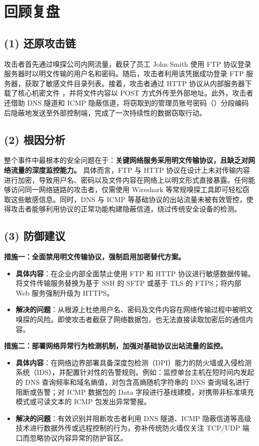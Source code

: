 \documentclass[12pt]{ctexart}
\begin{document}
	\section{回顾复盘}
	
	\subsection*{(1) 还原攻击链}
	
	攻击者首先通过嗅探公司内网流量，截获了员工 John Smith 使用 FTP 协议登录服务器时以明文传输的用户名和密码。随后，攻击者利用该凭据成功登录 FTP 服务器，获取了敏感文件目录列表。接着，攻击者通过 HTTP 协议从内部服务器下载了核心机密文件 ，并将文件内容以 POST 方式外传至外部地址。此外，攻击者还借助 DNS 隧道和 ICMP 隐蔽信道，将窃取到的管理员账号密码（）分段编码后隐蔽地发送至外部控制端，完成了一次持续性的数据窃取行动。
	
	\subsection*{(2) 根因分析}
	
	整个事件中最根本的安全问题在于：\textbf{关键网络服务采用明文传输协议，且缺乏对网络流量的深度监控能力。} 具体而言，FTP 与 HTTP 协议在设计上未对传输内容进行加密，导致用户名、密码以及文件内容在网络上以明文形式直接暴露。任何能够访问同一网络链路的攻击者，仅需使用 Wireshark 等常规嗅探工具即可轻松窃取这些敏感信息。同时，DNS 与 ICMP 等基础协议的出站流量未被有效管控，使得攻击者能够利用协议的正常功能构建隐蔽信道，绕过传统安全设备的检测。
	
	\subsection*{(3) 防御建议}
	
	\textbf{措施一：全面禁用明文传输协议，强制启用加密替代方案。}
	\begin{itemize}
		\item \textbf{具体内容}：在企业内部全面禁止使用 FTP 和 HTTP 协议进行敏感数据传输。将文件传输服务替换为基于 SSH 的 SFTP 或基于 TLS 的 FTPS；将内部 Web 服务强制升级为 HTTPS。
		\item \textbf{解决的问题}：从根源上杜绝用户名、密码及文件内容在网络传输过程中被明文嗅探的风险。即使攻击者截获了网络数据包，也无法直接读取加密后的通信内容。
	\end{itemize}
	
	\textbf{措施二：部署网络异常行为检测机制，加强对基础协议出站流量的监控。}
	\begin{itemize}
		\item \textbf{具体内容}：在网络边界部署具备深度包检测（DPI）能力的防火墙或入侵检测系统（IDS），并配置针对性的告警规则。例如：监控单台主机在短时间内发起的 DNS 查询频率和域名熵值，对包含高熵随机字符串的 DNS 查询域名进行阻断或告警；对 ICMP 数据包的 Data 字段进行基线建模，对携带非标准填充模式或可读文本的 ICMP 包发出异常警报。
		\item \textbf{解决的问题}：有效识别并阻断攻击者利用 DNS 隧道、ICMP 隐蔽信道等高级技术进行数据外传或远程控制的行为，弥补传统防火墙仅关注 TCP/UDP 端口而忽略协议内容异常的防护盲区。
	\end{itemize}
\end{document}
